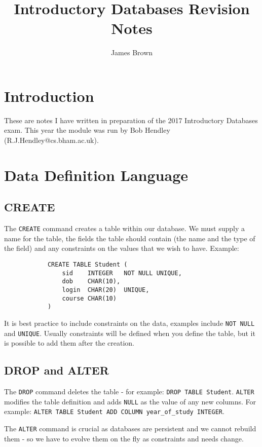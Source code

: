 \documentclass{article}
\title{Introductory Databases \linebreak Revision Notes}
\author{James Brown}
\begin{document}
	\maketitle
	\newpage
	\tableofcontents
	\newpage
	
	\section{Introduction}
	These are notes I have written in preparation of the 2017 Introductory Databases exam. This year the module was run by Bob Hendley (R.J.Hendley@cs.bham.ac.uk).
	
	\section{Data Definition Language}
	\subsection{CREATE}
	The \texttt{CREATE} command creates a table within our database. We must supply a name for the table, the fields the table should contain (the name and the type of the field) and any constraints on the values that we wish to have. Example:
		\begin{verbatim}
			CREATE TABLE Student (
			    sid    INTEGER   NOT NULL UNIQUE,
			    dob    CHAR(10),
			    login  CHAR(20)  UNIQUE,
			    course CHAR(10)
			)
		\end{verbatim}
	
	It is best practice to include constraints on the data, examples include \texttt{NOT NULL} and \texttt{UNIQUE}. Usually constraints will be defined when you define the table, but it is possible to add them after the creation.
	
	\subsection{DROP and ALTER}
	The \texttt{DROP} command deletes the table - for example: \texttt{DROP TABLE Student}.
	\texttt{ALTER} modifies the table definition and adds \texttt{NULL} as the value of any new columns. For example: \texttt{ALTER TABLE Student ADD COLUMN year\_of\_study INTEGER}.
	
	The \texttt{ALTER} command is crucial as databases are persistent and we cannot rebuild them - so we have to evolve them on the fly as constraints and needs change.
	
\end{document}
